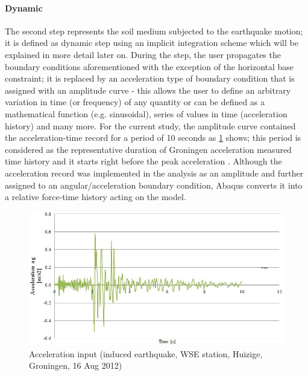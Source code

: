 	\paragraph{Dynamic}
	The second step represents the soil medium subjected to the earthquake motion; it is defined as dynamic step using an implicit integration scheme which will be explained in more detail later on. During the step, the user propagates the boundary conditions aforementioned with the exception of the horizontal base constraint; it is replaced by an acceleration type of boundary condition that is assigned with an amplitude curve - this allows the user to define an arbitrary variation in time (or frequency) of any quantity or can be defined as a mathematical function (e.g. sinusoidal), series of values in time (acceleration history) and many more. For the current study, the amplitude curve contained the acceleration-time record for a period of 10 seconds as \ref{Acceleration} shows; this period is considered as the representative duration of Groningen acceleration measured time history and it starts right before the peak acceleration \cite{dost2004scaling}. Although the acceleration record was implemented in the analysis as an amplitude and further assigned to an angular/acceleration boundary condition, Abaqus converts it into a relative force-time history acting on the model. 
	
	\begin{figure}[h!]
		\centering
		\includegraphics[width=0.8\linewidth]{"Acc input"}
		\caption{Acceleration input (induced earthquake, WSE station, Huizige, Groningen, 16 Aug 2012)}
		\label{Acceleration}
	\end{figure}
	
	\newpage
